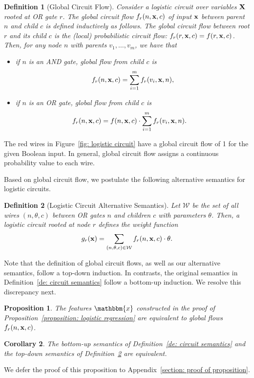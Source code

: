 \documentclass[letterpaper]{article} %
\newtheorem{corollary}{Corollary}
\newtheorem{proposition}[corollary]{Proposition}
\newtheorem{definition}{Definition}
\newcommand{\coe}{g}
\newcommand{\sample}{{\bf x}}
\begin{document}
\begin{definition}[Global Circuit Flow]
\label{definition: global flow}
Consider a logistic circuit over variables $\bf X$ rooted at OR gate $r$.
The global circuit flow $f_r(n, \sample, c)$ of input $\sample $ between parent $n$ and child $c$ is defined inductively as follows.
The global circuit flow between root $r$ and its child $c$ is the (local) probabilistic circuit flow: $f_r(r, \sample, c) = f(r, \sample, c)$.
Then, for any node $n$ with parents $v_1,\dots,v_m$, we have that
\begin{itemize}
\item[--] if $n$ is an AND gate, global flow from child $c$ is
\begin{align*}
f_r(n, \sample, c) = \sum_{i=1}^m f_r(v_i, \sample, n),
\end{align*}
\item[--] if $n$ is an OR gate, global flow from child $c$ is
\begin{align*}
f_r(n, \sample, c) &=  f(n, \sample,c) \cdot \sum_{i=1}^m  f_r(v_i, \sample, n).
\end{align*}
\end{itemize}
\end{definition}
The red wires in Figure~\ref{fig: logistic circuit} have a global circuit flow of 1 for the given Boolean input. In general, global circuit flow assigns a continuous probability value to each wire.

Based on global circuit flow, we postulate the following alternative semantics for logistic circuits.
\begin{definition}[Logistic Circuit Alternative Semantics]
\label{definition: circuit semantic using global flow}
Let $\mathcal{W}$ be the set of all wires $(n,
\theta,c)$ between OR gates $n$ and children $c$ with parameters $\theta$.
Then, a logistic circuit rooted at node $r$ defines the weight function
$$
\coe_r(\sample) = \sum_{(n,\theta,c) \in \mathcal{W}} f_r(n,\sample,c) \cdot \theta.
$$
\end{definition}

Note that the definition of global circuit flows, as well as our alternative semantics, follow a top-down induction.
In contrasts, the original semantics in Definition~\ref{de: circuit semantics} follow a bottom-up induction.
We resolve this discrepancy next.
\begin{proposition}
\label{proposition: features}
The features $\mathbbm{x}$ constructed in the proof of Proposition~\ref{proposition: logistic regression} are equivalent to global flows $f_r(n,\sample,c)$.
\end{proposition}
\begin{corollary}
The bottom-up semantics of Definition~\ref{de: circuit semantics} and the top-down semantics of Definition~\ref{definition: circuit semantic using global flow} are equivalent.
\end{corollary}
\noindent We defer the proof of this proposition to Appendix~\ref{section: proof of proposition}.
\end{document}
